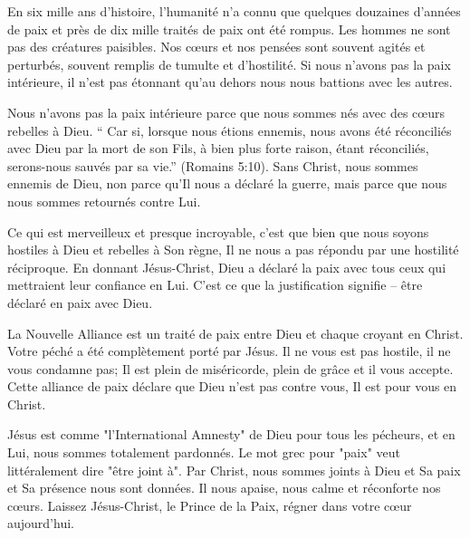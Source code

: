 

En six mille ans d'histoire, l'humanité n'a connu que quelques douzaines d'années de paix et près de dix mille traités de paix ont été rompus. Les hommes ne sont pas des créatures paisibles. Nos cœurs et nos pensées sont souvent agités et perturbés, souvent remplis de tumulte et d'hostilité. Si nous n'avons pas la paix intérieure, il n'est pas étonnant qu'au dehors nous nous battions avec les autres.

Nous n'avons pas la paix intérieure parce que nous sommes nés avec des cœurs rebelles à Dieu. “ Car si, lorsque nous étions ennemis, nous avons été réconciliés avec Dieu par la mort de son Fils, à bien plus forte raison, étant réconciliés, serons-nous sauvés par sa vie.” (Romains 5:10). Sans Christ, nous sommes ennemis de Dieu, non parce qu'Il nous a déclaré la guerre, mais parce que nous nous sommes retournés contre Lui.

Ce qui est merveilleux et presque incroyable, c'est que bien que nous soyons hostiles à Dieu et rebelles à Son règne, Il ne nous a pas répondu par une hostilité réciproque. En donnant Jésus-Christ, Dieu a déclaré la paix avec tous ceux qui mettraient leur confiance en Lui. C'est ce que la justification signifie – être déclaré en paix avec Dieu.

La Nouvelle Alliance est un traité de paix entre Dieu et chaque croyant en Christ. Votre péché a été complètement porté par Jésus. Il ne vous est pas hostile, il ne vous condamne pas; Il est plein de miséricorde, plein de grâce et il vous accepte. Cette alliance de paix déclare que Dieu n'est pas contre vous, Il est pour vous en Christ.

Jésus est comme "l'International Amnesty" de Dieu pour tous les pécheurs, et en Lui, nous sommes totalement pardonnés. Le mot grec pour "paix" veut littéralement dire "être joint à". Par Christ, nous sommes joints à Dieu et Sa paix et Sa présence nous sont données. Il nous apaise, nous calme et réconforte nos cœurs. Laissez Jésus-Christ, le Prince de la Paix, régner dans votre cœur aujourd'hui.



